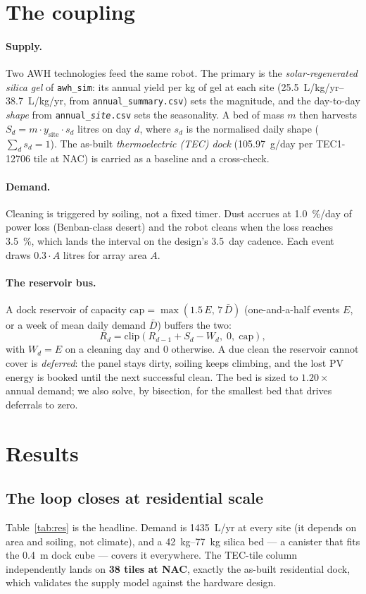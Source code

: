 \documentclass[11pt]{article}
\begin{document}
\section{The coupling}
\paragraph{Supply.} Two AWH technologies feed the same robot. The primary is the
\emph{solar-regenerated silica gel} of \texttt{awh\_sim}: its annual yield per kg
of gel at each site (\SIrange{25.5}{38.7}{L/kg/yr}, from
\texttt{annual\_summary.csv}) sets the magnitude, and the day-to-day
\emph{shape} from \texttt{annual\_\textit{site}.csv} sets the seasonality. A bed
of mass $m$ then harvests $S_d = m\cdot y_{\text{site}}\cdot s_d$ litres on day
$d$, where $s_d$ is the normalised daily shape ($\sum_d s_d = 1$). The as-built
\emph{thermoelectric (TEC) dock} (\SI{105.97}{g/day} per TEC1-12706 tile at NAC)
is carried as a baseline and a cross-check.

\paragraph{Demand.} Cleaning is triggered by soiling, not a fixed timer. Dust
accrues at \SI{1.0}{\percent/day} of power loss (Benban-class desert) and the
robot cleans when the loss reaches \SI{3.5}{\percent}, which lands the interval
on the design's \SI{3.5}{day} cadence. Each event draws $0.3\cdot A$ litres for
array area $A$.

\paragraph{The reservoir bus.} A dock reservoir of capacity
$\mathrm{cap}=\max(1.5\,E,\,7\,\bar D)$ (one-and-a-half events $E$, or a week of
mean daily demand $\bar D$) buffers the two:
\[
R_d = \mathrm{clip}\!\left(R_{d-1} + S_d - W_d,\; 0,\; \mathrm{cap}\right),
\]
with $W_d=E$ on a cleaning day and $0$ otherwise. A due clean the reservoir
cannot cover is \emph{deferred}: the panel stays dirty, soiling keeps climbing,
and the lost PV energy is booked until the next successful clean. The bed is
sized to $1.20\times$ annual demand; we also solve, by bisection, for the
smallest bed that drives deferrals to zero.

\section{Results}
\subsection{The loop closes at residential scale}
Table~\ref{tab:res} is the headline. Demand is \SI{1435}{L/yr} at every site
(it depends on area and soiling, not climate), and a \SIrange{42}{77}{kg} silica
bed --- a canister that fits the \SI{0.4}{m} dock cube --- covers it everywhere.
The TEC-tile column independently lands on \textbf{38 tiles at NAC}, exactly the
as-built residential dock, which validates the supply model against the
hardware design.
\end{document}
